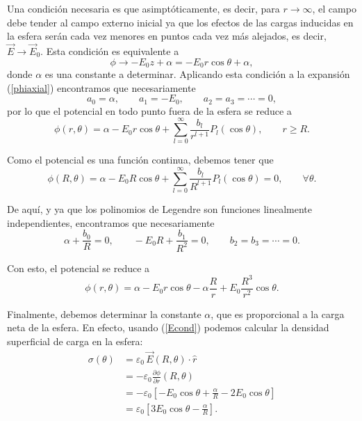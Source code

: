 Una condición necesaria es que asimptóticamente, es decir, para $r\to\infty$, el campo debe tender al campo externo inicial ya que los efectos de las cargas inducidas en la esfera serán cada vez menores en puntos cada vez más alejados, es decir, $\vec{E}\to\vec{E}_0 $. Esta condición es equivalente a 
\begin{equation}
\phi\to -E_0z+\alpha=-E_0r\cos\theta+\alpha,
\end{equation}
donde $\alpha$ es una constante a determinar. Aplicando esta condición a la expansión (\ref{phiaxial}) encontramos que necesariamente
\begin{equation}
a_0=\alpha, \qquad a_1=-E_0, \qquad a_2=a_3=\cdots =0,
\end{equation}
por lo que el potencial en todo punto  fuera de la esfera se reduce a 
\begin{equation}
\phi(r,\theta)=\alpha -E_0 r\cos\theta +
\sum_{l=0}^\infty\frac{b_l}{r^{l+1}}P_l(\cos\theta), \qquad r\ge R.
\end{equation}

Como el potencial es una función continua, debemos tener que
\begin{equation}
\phi(R,\theta)=\alpha -E_0 R\cos\theta +
\sum_{l=0}^\infty\frac{b_l}{R^{l+1}}P_l(\cos\theta)=0, \qquad \forall \theta.
\end{equation}

De aquí, y ya que los polinomios de Legendre son funciones linealmente independientes, encontramos que necesariamente
\begin{equation}
\alpha+\frac{b_0}{R}=0, \qquad -E_0R+\frac{b_1}{R^2}=0, \qquad b_2=b_3=\cdots =0.
\end{equation}

Con esto, el potencial se reduce a
\begin{equation}\label{phialpha}
\phi(r,\theta)=\alpha -E_0 r\cos\theta -\alpha\frac{R}{r}+E_0 \frac{R^3}{r^2}\cos\theta. 
\end{equation}

Finalmente, debemos determinar la constante $\alpha$, que es proporcional a la carga neta de la esfera. En efecto, usando (\ref{Econd}) podemos calcular la densidad superficial de carga en la esfera:
\begin{align}
\sigma(\theta) &= \varepsilon_0\, \vec{E}(R,\theta)\cdot\hat{r} \\
&= -\varepsilon_0 \frac{\partial\phi}{\partial r}(R,\theta) \\
&= -\varepsilon_0\left[-E_0\cos\theta+\frac{\alpha}{R}-2E_0\cos\theta\right]\\
&= \varepsilon_0\left[3E_0\cos\theta-\frac{\alpha}{R}\right].
\end{align}

